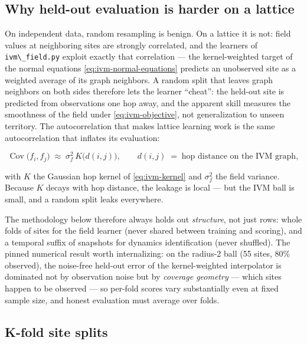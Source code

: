 \documentclass[
  10pt,
]{article}
\newcommand{\passthrough}[1]{#1}
\begin{document}
\subsection{Why held-out evaluation is harder on a
lattice}\label{why-held-out-evaluation-is-harder-on-a-lattice}

On independent data, random resampling is benign. On a lattice it is
not: field values at neighboring sites are strongly correlated, and the
learners of \passthrough{\lstinline!ivm\_field.py!} exploit exactly that
correlation --- the kernel-weighted target of the normal equations
\eqref{eq:ivm-normal-equations} predicts an unobserved site as a
weighted average of its graph neighbors. A random split that leaves
graph neighbors on both sides therefore lets the learner ``cheat'': the
held-out site is predicted from observations one hop away, and the
apparent skill measures the smoothness of the field under
\eqref{eq:ivm-objective}, not generalization to unseen territory. The
autocorrelation that makes lattice learning work is the same
autocorrelation that inflates its evaluation:

\begin{equation}
\label{eq:learn-correlation}
\operatorname{Cov}\bigl(f_i, f_j\bigr) \;\approx\; \sigma_f^{2}\,
K\bigl(d(i,j)\bigr),
\qquad d(i,j) \;=\; \text{hop distance on the IVM graph},
\end{equation}

with \(K\) the Gaussian hop kernel of \eqref{eq:ivm-kernel} and
\(\sigma_f^2\) the field variance. Because \(K\) decays with hop
distance, the leakage is local --- but the IVM ball is small, and a
random split leaks everywhere.

The methodology below therefore always holds out \emph{structure}, not
just rows: whole folds of sites for the field learner (never shared
between training and scoring), and a temporal suffix of snapshots for
dynamics identification (never shuffled). The pinned numerical result
worth internalizing: on the radius-2 ball (55 sites, 80\% observed), the
noise-free held-out error of the kernel-weighted interpolator is
dominated not by observation noise but by \emph{coverage geometry} ---
which sites happen to be observed --- so per-fold scores vary
substantially even at fixed sample size, and honest evaluation must
average over folds.

\subsection{K-fold site splits}\label{k-fold-site-splits}
\end{document}
